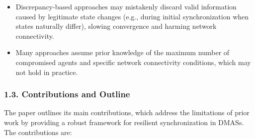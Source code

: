 \documentclass{article}
\begin{document}
\begin{itemize}
\begin{itemize}
        \item Discrepancy-based approaches may mistakenly discard valid information caused by legitimate state changes (e.g., during initial synchronization when states naturally differ), slowing convergence and harming network connectivity.
        \item Many approaches assume prior knowledge of the maximum number of compromised agents and specific network connectivity conditions, which may not hold in practice.
    \end{itemize}
\end{itemize}

\subsubsection*{1.3. Contributions and Outline}
The paper outlines its main contributions, which address the limitations of prior work by providing a robust framework for resilient synchronization in DMASs. The contributions are:
\end{document}
